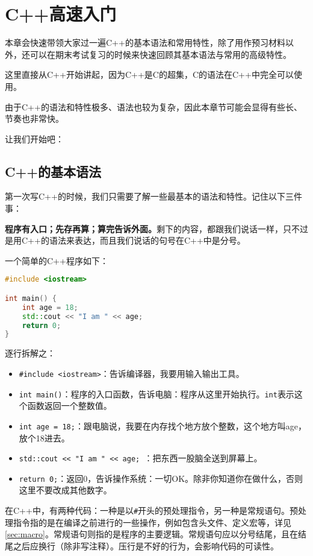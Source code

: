 \chapter{C++高速入门}

本章会快速带领大家过一遍C++的基本语法和常用特性，除了用作预习材料以外，还可以在期末考试复习的时候来快速回顾其基本语法与常用的高级特性。

这里直接从C++开始讲起，因为C++是C的超集，C的语法在C++中完全可以使用。

由于C++的语法和特性极多、语法也较为复杂，因此本章节可能会显得有些长、节奏也非常快。

让我们开始吧：

\section{C++的基本语法}

第一次写C++的时候，我们只需要了解一些最基本的语法和特性。记住以下三件事：

\textbf{程序有入口；先存再算；算完告诉外面。}剩下的内容，都跟我们说话一样，只不过是用C++的语法来表达，而且我们说话的句号在C++中是分号。

一个简单的C++程序如下：
\begin{lstlisting}[language=C++]
#include <iostream>

int main() {
    int age = 18;
    std::cout << "I am " << age;
    return 0;
}
\end{lstlisting}
逐行拆解之：
\begin{itemize}
  \item \texttt{\#include <iostream>}：告诉编译器，我要用输入输出工具。
  \item \texttt{int main()}：程序的入口函数，告诉电脑：程序从这里开始执行。\texttt{int}表示这个函数返回一个整数值。
  \item \texttt{int age = 18;}：跟电脑说，我要在内存找个地方放个整数，这个地方叫age，放个18进去。
  \item \texttt{std::cout << "I am " << age; }：把东西一股脑全送到屏幕上。
  \item \texttt{return 0;}：返回0，告诉操作系统：一切OK。除非你知道你在做什么，否则这里不要改成其他数字。
\end{itemize}

在C++中，有两种代码：一种是以\texttt{\#}开头的预处理指令，另一种是常规语句。预处理指令指的是在编译之前进行的一些操作，例如包含头文件、定义宏等，详见\ref{sec:macro}。常规语句则指的是程序的主要逻辑。常规语句应以分号结尾，且在结尾之后应换行（除非写注释）。压行是不好的行为，会影响代码的可读性。

